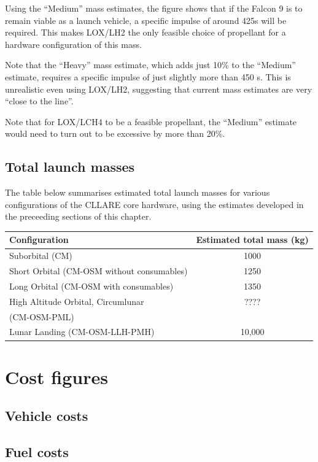 \documentclass{report}
\begin{document}
Using the ``Medium'' mass estimates, the figure shows that if the Falcon 9 is to remain viable as a launch vehicle, a specific impulse of around 425s will be required.  This makes LOX/LH2 the only feasible choice of propellant for a hardware configuration of this mass.

Note that the ``Heavy'' mass estimate, which adds just 10\% to the ``Medium'' estimate, requires a specific impulse of just slightly more than 450 s.  This is unrealistic even using LOX/LH2, suggesting that current mass estimates are very ``close to the line''.

Note that for LOX/LCH4 to be a feasible propellant, the ``Medium'' estimate would need to turn out to be excessive by more than 20\%.

\subsection{Total launch masses}

The table below summarises estimated total launch masses for various configurations of the CLLARE core hardware, using the estimates developed in the preceeding sections of this chapter.

\begin{tabular}{ | l | c | }
\hline
Configuration & Estimated total mass (kg) \\
\hline
\hline
Suborbital (CM) & 1000 \\
\hline
Short Orbital (CM-OSM without consumables) & 1250 \\
\hline
Long Orbital (CM-OSM with consumables) & 1350 \\
\hline
High Altitude Orbital, Circumlunar & ???? \\
(CM-OSM-PML) & \\
\hline
Lunar Landing (CM-OSM-LLH-PMH) & 10,000 \\
\hline
\end{tabular}

\section{Cost figures}

\subsection{Vehicle costs}

\subsection{Fuel costs}
\end{document}
